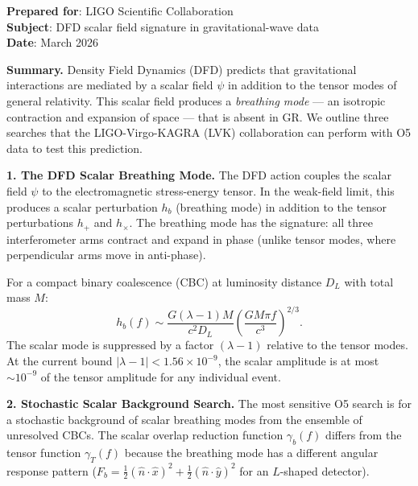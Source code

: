 \documentclass[11pt]{article}
\newcommand{\ee}[1]{\times 10^{#1}}
\newcommand{\lbone}{|\lambda - 1|}
\begin{document}
\begin{tcolorbox}[colback=white, colframe=black, breakable,
  title=\textbf{WHITE PAPER: Searching for Scalar Breathing Modes
  in LIGO O5 Data}]

\textbf{Prepared for}: LIGO Scientific Collaboration\\
\textbf{Subject}: DFD scalar field signature in gravitational-wave data\\
\textbf{Date}: March 2026

\bigskip

\textbf{Summary.} Density Field Dynamics (DFD) predicts that
gravitational interactions are mediated by a scalar field $\psi$ in
addition to the tensor modes of general relativity. This scalar field
produces a \emph{breathing mode} --- an isotropic contraction and
expansion of space --- that is absent in GR. We outline three searches
that the LIGO-Virgo-KAGRA (LVK) collaboration can perform with O5 data
to test this prediction.

\bigskip

\textbf{1. The DFD Scalar Breathing Mode.}
The DFD action couples the scalar field $\psi$ to the electromagnetic
stress-energy tensor. In the weak-field limit, this produces a scalar
perturbation $h_b$ (breathing mode) in addition to the tensor
perturbations $h_+$ and $h_\times$. The breathing mode has the
signature: all three interferometer arms contract and expand in phase
(unlike tensor modes, where perpendicular arms move in anti-phase).

For a compact binary coalescence (CBC) at luminosity distance $D_L$
with total mass $M$:
\begin{equation}
h_b(f) \sim \frac{G(\lambda - 1)M}{c^2 D_L}\left(\frac{G M \pi f}
{c^3}\right)^{2/3}.
\end{equation}
The scalar mode is suppressed by a factor $(\lambda - 1)$ relative to
the tensor modes. At the current bound $\lbone < 1.56\ee{-9}$, the
scalar amplitude is at most $\sim 10^{-9}$ of the tensor amplitude
for any individual event.

\bigskip

\textbf{2. Stochastic Scalar Background Search.}
The most sensitive O5 search is for a stochastic background of scalar
breathing modes from the ensemble of unresolved CBCs. The scalar
overlap reduction function $\gamma_b(f)$ differs from the tensor
function $\gamma_T(f)$ because the breathing mode has a different
angular response pattern ($F_b = \frac{1}{2}(\hat{n}\cdot\hat{x})^2
+ \frac{1}{2}(\hat{n}\cdot\hat{y})^2$ for an $L$-shaped detector).


\end{tcolorbox}
\end{document}
